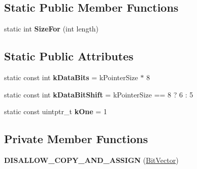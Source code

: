 \subsection*{Static Public Member Functions}
\begin{DoxyCompactItemize}
\item 
static int {\bfseries Size\+For} (int length)\hypertarget{classv8_1_1internal_1_1_bit_vector_adc077289e0cf2fa2744184695a771c6c}{}\label{classv8_1_1internal_1_1_bit_vector_adc077289e0cf2fa2744184695a771c6c}

\end{DoxyCompactItemize}
\subsection*{Static Public Attributes}
\begin{DoxyCompactItemize}
\item 
static const int {\bfseries k\+Data\+Bits} = k\+Pointer\+Size $\ast$ 8\hypertarget{classv8_1_1internal_1_1_bit_vector_ad00352de5ea7bd99f60f2e3441f3c0c9}{}\label{classv8_1_1internal_1_1_bit_vector_ad00352de5ea7bd99f60f2e3441f3c0c9}

\item 
static const int {\bfseries k\+Data\+Bit\+Shift} = k\+Pointer\+Size == 8 ? 6 \+: 5\hypertarget{classv8_1_1internal_1_1_bit_vector_af8348444ed8aeb66a13a991e81a86b41}{}\label{classv8_1_1internal_1_1_bit_vector_af8348444ed8aeb66a13a991e81a86b41}

\item 
static const uintptr\+\_\+t {\bfseries k\+One} = 1\hypertarget{classv8_1_1internal_1_1_bit_vector_abd12b43dc714a1b894ab4130edae1d57}{}\label{classv8_1_1internal_1_1_bit_vector_abd12b43dc714a1b894ab4130edae1d57}

\end{DoxyCompactItemize}
\subsection*{Private Member Functions}
\begin{DoxyCompactItemize}
\item 
{\bfseries D\+I\+S\+A\+L\+L\+O\+W\+\_\+\+C\+O\+P\+Y\+\_\+\+A\+N\+D\+\_\+\+A\+S\+S\+I\+GN} (\hyperlink{classv8_1_1internal_1_1_bit_vector}{Bit\+Vector})\hypertarget{classv8_1_1internal_1_1_bit_vector_acb8f761692e2596f489a646242ca340f}{}\label{classv8_1_1internal_1_1_bit_vector_acb8f761692e2596f489a646242ca340f}

\end{DoxyCompactItemize}
